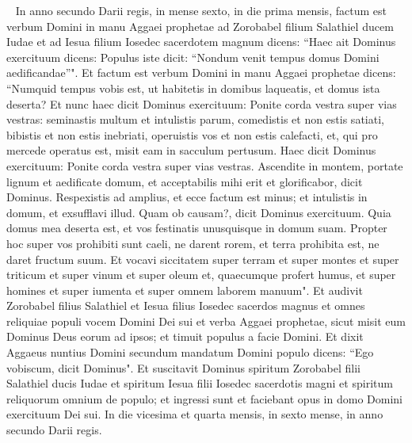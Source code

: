 
\begin{biblechapter}   
\verse In anno secundo Darii regis, in mense sexto, in die prima mensis, factum est verbum Domini in manu Aggaei prophetae ad Zorobabel filium Salathiel ducem Iudae et ad Iesua filium Iosedec sacerdotem magnum dicens: 
\verse “Haec ait Dominus exercituum dicens: Populus iste dicit: “Nondum venit tempus domus Domini aedificandae”". 
\verse Et factum est verbum Domini in manu Aggaei prophetae dicens: 
\verse “Numquid tempus vobis est, ut habitetis in domibus laqueatis, et domus ista deserta? 
\verse Et nunc haec dicit Dominus exercituum: Ponite corda vestra super vias vestras: 
\verse seminastis multum et intulistis parum, comedistis et non estis satiati, bibistis et non estis inebriati, operuistis vos et non estis calefacti, et, qui pro mercede operatus est, misit eam in sacculum pertusum. 
\verse Haec dicit Dominus exercituum: Ponite corda vestra super vias vestras. 
\verse Ascendite in montem, portate lignum et aedificate domum, et acceptabilis mihi erit et glorificabor, dicit Dominus.  
\verse Respexistis ad amplius, et ecce factum est minus; et intulistis in domum, et exsufflavi illud. Quam ob causam?, dicit Dominus exercituum. Quia domus mea deserta est, et vos festinatis unusquisque in domum suam. 
\verse Propter hoc super vos prohibiti sunt caeli, ne darent rorem, et terra prohibita est, ne daret fructum suum. 
\verse Et vocavi siccitatem super terram et super montes et super triticum et super vinum et super oleum et, quaecumque profert humus, et super homines et super iumenta et super omnem laborem manuum". 
\verse Et audivit Zorobabel filius Salathiel et Iesua filius Iosedec sacerdos magnus et omnes reliquiae populi vocem Domini Dei sui et verba Aggaei prophetae, sicut misit eum Dominus Deus eorum ad ipsos; et timuit populus a facie Domini. 
\verse Et dixit Aggaeus nuntius Domini secundum mandatum Domini populo dicens: “Ego vobiscum, dicit Dominus". 
\verse Et suscitavit Dominus spiritum Zorobabel filii Salathiel ducis Iudae et spiritum Iesua filii Iosedec sacerdotis magni et spiritum reliquorum omnium de populo; et ingressi sunt et faciebant opus in domo Domini exercituum Dei sui. 
\verse In die vicesima et quarta mensis, in sexto mense, in anno secundo Darii regis. 
\end{biblechapter}

